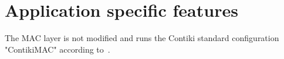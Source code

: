 \documentclass[conference]{IEEEtran}
\begin{document}
\section{Application specific features}
The MAC layer is not modified and runs the Contiki standard configuration "ContikiMAC" according to~\cite{dunkels2011contikimac}.
%
%



%
%
\end{document}
